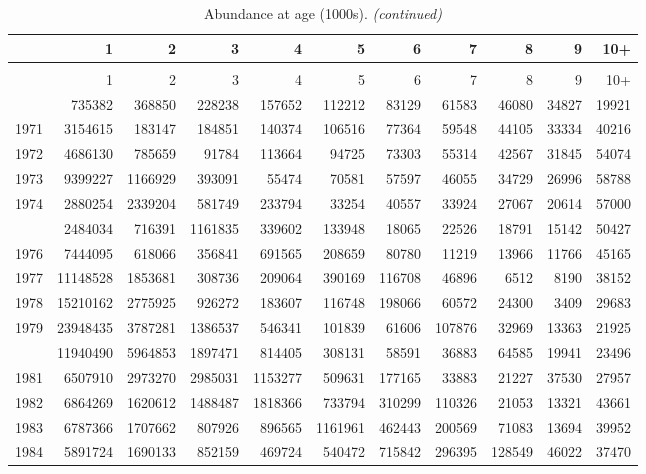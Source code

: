 \documentclass[
]{article}
\begin{document}
\begin{longtable}[t]{lrrrrrrrrrr}
\caption{\label{tab:NAA-table}Abundance at age (1000s).}\\
\toprule
  & 1 & 2 & 3 & 4 & 5 & 6 & 7 & 8 & 9 & 10+\\
\midrule
\endfirsthead
\caption[]{Abundance at age (1000s). \textit{(continued)}}\\
\toprule
  & 1 & 2 & 3 & 4 & 5 & 6 & 7 & 8 & 9 & 10+\\
\midrule
\endhead

\endfoot
\bottomrule
\endlastfoot
1970 & 735382 & 368850 & 228238 & 157652 & 112212 & 83129 & 61583 & 46080 & 34827 & 19921\\
1971 & 3154615 & 183147 & 184851 & 140374 & 106516 & 77364 & 59548 & 44105 & 33334 & 40216\\
1972 & 4686130 & 785659 & 91784 & 113664 & 94725 & 73303 & 55314 & 42567 & 31845 & 54074\\
1973 & 9399227 & 1166929 & 393091 & 55474 & 70581 & 57597 & 46055 & 34729 & 26996 & 58788\\
1974 & 2880254 & 2339204 & 581749 & 233794 & 33254 & 40557 & 33924 & 27067 & 20614 & 57000\\
\addlinespace
1975 & 2484034 & 716391 & 1161835 & 339602 & 133948 & 18065 & 22526 & 18791 & 15142 & 50427\\
1976 & 7444095 & 618066 & 356841 & 691565 & 208659 & 80780 & 11219 & 13966 & 11766 & 45165\\
1977 & 11148528 & 1853681 & 308736 & 209064 & 390169 & 116708 & 46896 & 6512 & 8190 & 38152\\
1978 & 15210162 & 2775925 & 926272 & 183607 & 116748 & 198066 & 60572 & 24300 & 3409 & 29683\\
1979 & 23948435 & 3787281 & 1386537 & 546341 & 101839 & 61606 & 107876 & 32969 & 13363 & 21925\\
\addlinespace
1980 & 11940490 & 5964853 & 1897471 & 814405 & 308131 & 58591 & 36883 & 64585 & 19941 & 23496\\
1981 & 6507910 & 2973270 & 2985031 & 1153277 & 509631 & 177165 & 33883 & 21227 & 37530 & 27957\\
1982 & 6864269 & 1620612 & 1488487 & 1818366 & 733794 & 310299 & 110326 & 21053 & 13321 & 43661\\
1983 & 6787366 & 1707662 & 807926 & 896565 & 1161961 & 462443 & 200569 & 71083 & 13694 & 39952\\
1984 & 5891724 & 1690133 & 852159 & 469724 & 540472 & 715842 & 296395 & 128549 & 46022 & 37470\\

\end{longtable}
\end{document}
